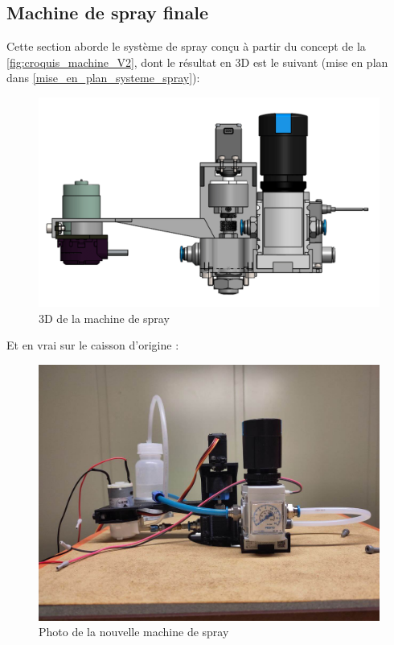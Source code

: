 \subsection{Machine de spray finale}
Cette section aborde le système de spray conçu à partir du concept de la \autoref{fig:croquis_machine_V2}, dont le résultat en 3D est le suivant (mise en plan dans \autoref{mise_en_plan_systeme_spray}):
\begin{figure}[H]
    \centering
    \includegraphics[width = \textwidth]{assets/figures/ameliorations/3D_machine_spray.png}
    \caption{3D de la machine de spray}
\end{figure}
Et en vrai sur le caisson d'origine :
\begin{figure}[H]
    \centering
    \includegraphics[width = \textwidth, trim = {0 0cm 0 4cm}, clip]{assets/figures/ameliorations/photo_machine_de_spray.jpeg}
    \caption{Photo de la nouvelle machine de spray}
\end{figure}

